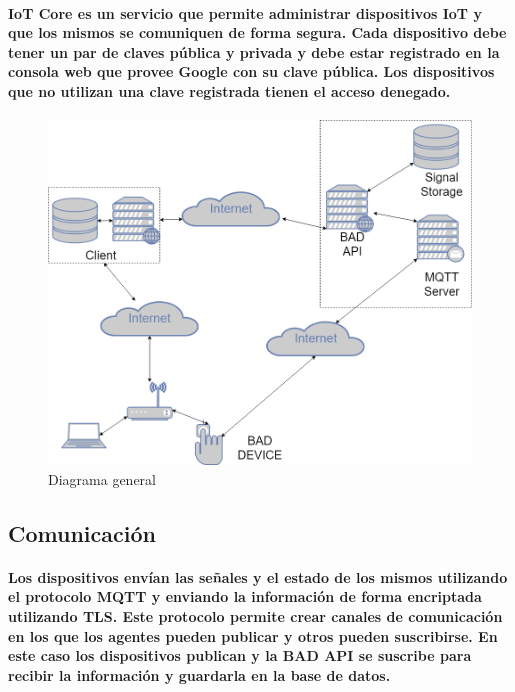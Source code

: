 \documentclass{article}
\begin{document}
\paragraph{
IoT Core es un servicio que permite administrar dispositivos IoT y que los mismos se comuniquen de forma segura. Cada dispositivo debe tener un par de claves pública y privada y debe estar registrado en la consola web que provee Google con su clave pública. Los dispositivos que no utilizan una clave registrada tienen el acceso denegado.
}

\begin{figure}[ht]
    \centering
    \includegraphics[width=\textwidth]{diagrama_general.png}%
    \caption{Diagrama general}
    \label{fig:generaldiagram}
\end{figure}

\subsection{Comunicación}
\paragraph{
Los dispositivos envían las señales y el estado de los mismos utilizando el protocolo MQTT y enviando la información de forma encriptada utilizando TLS. Este protocolo permite crear canales de comunicación en los que los agentes pueden publicar y otros pueden suscribirse. En este caso los dispositivos publican y la BAD API se suscribe para recibir la información y guardarla en la base de datos.
}
\end{document}

